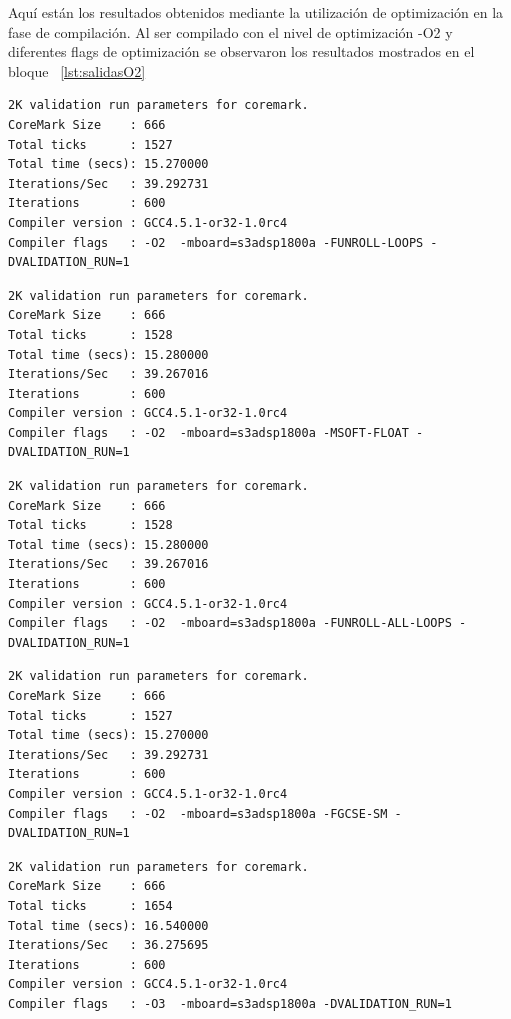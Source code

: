 Aquí están los resultados obtenidos mediante la utilización de optimización en la fase de compilación. Al ser compilado con el nivel de optimización
-O2 y diferentes flags de optimización se observaron los resultados mostrados en el bloque ~\ref{lst:salidasO2}

\begin{lstlisting}[frame=single,caption={Optimización nivel -O2 - Flags activos : -FUNROLL-LOOPS },label={lst:salidasO2},breaklines]
2K validation run parameters for coremark.
CoreMark Size    : 666
Total ticks      : 1527
Total time (secs): 15.270000
Iterations/Sec   : 39.292731
Iterations       : 600
Compiler version : GCC4.5.1-or32-1.0rc4
Compiler flags   : -O2  -mboard=s3adsp1800a -FUNROLL-LOOPS -DVALIDATION_RUN=1  
\end{lstlisting}

\begin{lstlisting}[frame=single,caption={Optimización nivel -O2 - Flags activos : -MSOFT-FLOAT},label={lst:salidas},breaklines]
2K validation run parameters for coremark.
CoreMark Size    : 666
Total ticks      : 1528
Total time (secs): 15.280000
Iterations/Sec   : 39.267016
Iterations       : 600
Compiler version : GCC4.5.1-or32-1.0rc4
Compiler flags   : -O2  -mboard=s3adsp1800a -MSOFT-FLOAT -DVALIDATION_RUN=1  
\end{lstlisting}

\begin{lstlisting}[frame=single,caption={Optimización nivel -O2 - Flags activos : -FUNROLL-ALL-LOOPS},label={lst:salidas},breaklines]
2K validation run parameters for coremark.
CoreMark Size    : 666
Total ticks      : 1528
Total time (secs): 15.280000
Iterations/Sec   : 39.267016
Iterations       : 600
Compiler version : GCC4.5.1-or32-1.0rc4
Compiler flags   : -O2  -mboard=s3adsp1800a -FUNROLL-ALL-LOOPS -DVALIDATION_RUN=1  
\end{lstlisting}

\begin{lstlisting}[frame=single,caption={Optimización nivel -O2 - Flags activos : -FGCSE-SM},label={lst:salidas},breaklines]
2K validation run parameters for coremark.
CoreMark Size    : 666
Total ticks      : 1527
Total time (secs): 15.270000
Iterations/Sec   : 39.292731
Iterations       : 600
Compiler version : GCC4.5.1-or32-1.0rc4
Compiler flags   : -O2  -mboard=s3adsp1800a -FGCSE-SM -DVALIDATION_RUN=1  
\end{lstlisting}

\begin{lstlisting}[frame=single,caption={Optimización nivel -O3 - Sin Flags activos},label={lst:salidas},breaklines]
2K validation run parameters for coremark.
CoreMark Size    : 666
Total ticks      : 1654
Total time (secs): 16.540000
Iterations/Sec   : 36.275695
Iterations       : 600
Compiler version : GCC4.5.1-or32-1.0rc4
Compiler flags   : -O3  -mboard=s3adsp1800a -DVALIDATION_RUN=1  
\end{lstlisting}

